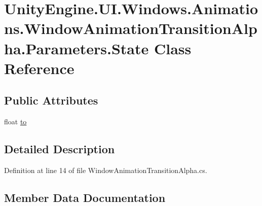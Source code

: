 \hypertarget{class_unity_engine_1_1_u_i_1_1_windows_1_1_animations_1_1_window_animation_transition_alpha_1_1_parameters_1_1_state}{}\section{Unity\+Engine.\+U\+I.\+Windows.\+Animations.\+Window\+Animation\+Transition\+Alpha.\+Parameters.\+State Class Reference}
\label{class_unity_engine_1_1_u_i_1_1_windows_1_1_animations_1_1_window_animation_transition_alpha_1_1_parameters_1_1_state}
\subsection*{Public Attributes}
\begin{DoxyCompactItemize}
\item 
float \hyperlink{class_unity_engine_1_1_u_i_1_1_windows_1_1_animations_1_1_window_animation_transition_alpha_1_1_parameters_1_1_state_a38d43a9dbbddb7028ef696000e900404}{to}
\end{DoxyCompactItemize}


\subsection{Detailed Description}


Definition at line 14 of file Window\+Animation\+Transition\+Alpha.\+cs.



\subsection{Member Data Documentation}
\hypertarget{class_unity_engine_1_1_u_i_1_1_windows_1_1_animations_1_1_window_animation_transition_alpha_1_1_parameters_1_1_state_a38d43a9dbbddb7028ef696000e900404}{}
